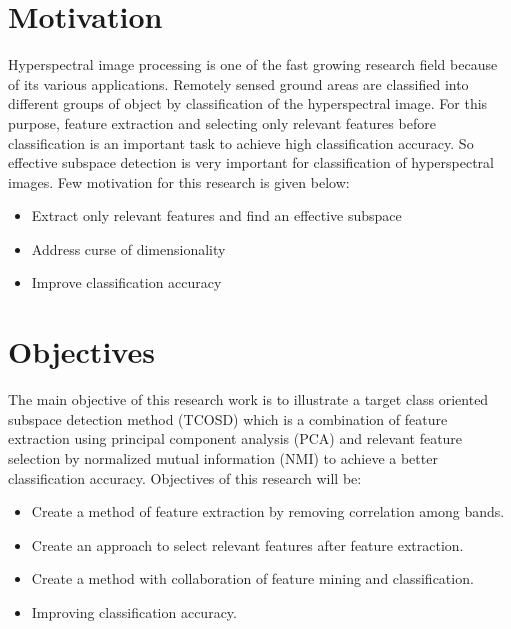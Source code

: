 \documentclass[document.tex]{subfiles}
\begin{document}
\section{Motivation}
\noindent Hyperspectral image processing is  one of the fast growing research field because of its various applications. Remotely sensed ground areas are classified into different groups of object by classification of the hyperspectral image. For this purpose, feature extraction and selecting only relevant features before classification is an important task to achieve high classification accuracy. So effective subspace detection is very important for classification of hyperspectral images. Few motivation for this research is given below:
\begin{itemize}
	\item Extract only relevant features and find an effective subspace
	\item Address curse of dimensionality\cite{1}
	\item Improve classification accuracy
\end{itemize}

\section{Objectives}
\noindent The main objective of this research work is to illustrate a target class oriented subspace detection method (TCOSD) which is a combination of feature extraction using principal component analysis (PCA) and relevant feature selection by normalized mutual information (NMI) to achieve a better classification accuracy. Objectives of this research will be:
\begin{itemize}
	\item Create a method of feature extraction by removing correlation among bands.
	\item Create an approach to select relevant features after feature extraction.
	\item Create a method with collaboration of feature mining and classification.
	\item Improving classification accuracy.
\end{itemize}
\end{document}
